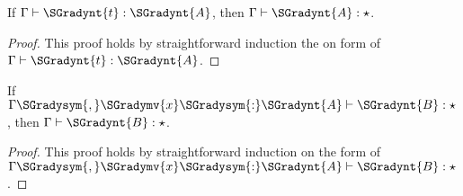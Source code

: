 \begin{lemma}
  \label{lemma:kinding_for_typing}
  If $ \Gamma  \vdash  \SGradynt{t}  :  \SGradynt{A} $, then $ \Gamma  \vdash  \SGradynt{A}  : \star $.
\end{lemma}
\begin{proof}
  This proof holds by straightforward induction the on form of $ \Gamma  \vdash  \SGradynt{t}  :  \SGradynt{A} $.
\end{proof}

\begin{lemma}
  \label{lemma:strengthening_for_kinding}
  If $ \Gamma  \SGradysym{,}  \SGradymv{x}  \SGradysym{:}  \SGradynt{A}  \vdash  \SGradynt{B}  : \star $, then $ \Gamma  \vdash  \SGradynt{B}  : \star $.
\end{lemma}
\begin{proof}
  This proof holds by straightforward induction on the form of $ \Gamma  \SGradysym{,}  \SGradymv{x}  \SGradysym{:}  \SGradynt{A}  \vdash  \SGradynt{B}  : \star $.
\end{proof}

